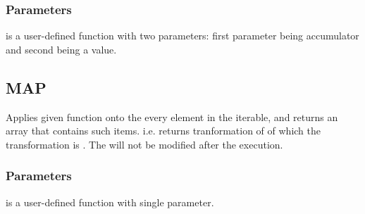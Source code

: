        \subsubsection*{Parameters}
        \begin{itemlist}
        \item {} is a user-defined function with two parameters: first parameter being accumulator and second being a value.
        \end{itemlist}
    \subsection{MAP}
        \par
        Applies given function onto the every element in the iterable, and returns an array that contains such items. i.e. returns tranformation of  of which the transformation is . The  will not be modified after the execution.
        \subsubsection*{Parameters}
        \begin{itemlist}
        \item {} is a user-defined function with single parameter.
        \end{itemlist}
